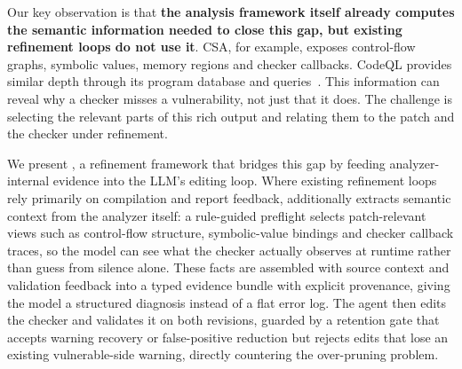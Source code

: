 Our key observation is that \textbf{the analysis framework itself already computes the semantic information needed to close this gap, but existing refinement loops do not use it}.
CSA, for example, exposes control-flow graphs, symbolic values, memory regions and checker callbacks. CodeQL provides similar depth through its program database and queries~\cite{avgustinov2016ql,codeqlDocs}.
This information can reveal why a checker misses a vulnerability, not just that it does.
The challenge is selecting the relevant parts of this rich output and relating them to the patch and the checker under refinement.

We present \toolname, a refinement framework that bridges this gap by feeding analyzer-internal evidence into the LLM's editing loop.
Where existing refinement loops rely primarily on compilation and report feedback, \toolname additionally extracts semantic context from the analyzer itself: a rule-guided preflight selects patch-relevant views such as control-flow structure, symbolic-value bindings and checker callback traces, so the model can see what the checker actually observes at runtime rather than guess from silence alone.
These facts are assembled with source context and validation feedback into a typed evidence bundle with explicit provenance, giving the model a structured diagnosis instead of a flat error log.
The agent then edits the checker and validates it on both revisions, guarded by a retention gate that accepts warning recovery or false-positive reduction but rejects edits that lose an existing vulnerable-side warning, directly countering the over-pruning problem.

